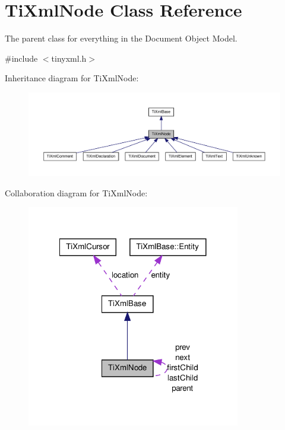 \hypertarget{classTiXmlNode}{
\section{TiXmlNode Class Reference}
\label{d3/dd5/classTiXmlNode}
}


The parent class for everything in the Document Object Model.  




{\ttfamily \#include $<$tinyxml.h$>$}



Inheritance diagram for TiXmlNode:
\nopagebreak
\begin{figure}[H]
\begin{center}
\leavevmode
\includegraphics[width=400pt]{d8/d06/classTiXmlNode__inherit__graph}
\end{center}
\end{figure}


Collaboration diagram for TiXmlNode:
\nopagebreak
\begin{figure}[H]
\begin{center}
\leavevmode
\includegraphics[width=264pt]{d4/d39/classTiXmlNode__coll__graph}
\end{center}
\end{figure}
